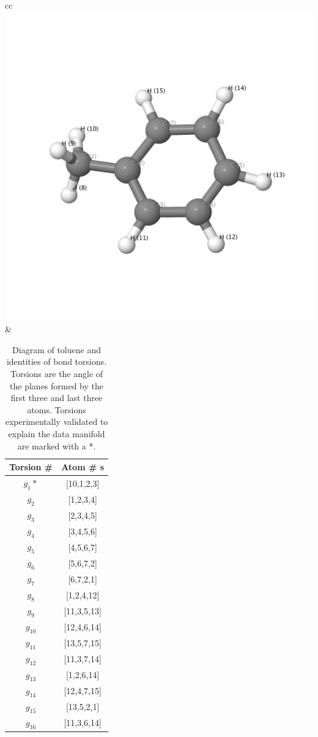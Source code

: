 \begin{table}[hbt!]
\begin{tabular}{cc}
\includegraphics[scale=0.25,valign=m]{../Figures/toluene/toluene.png}
&
\begin{tabular}{ | c | c | } 
\hline
Torsion \# & Atom \# s \\
\hline
$g_1*$ & [10,1,2,3]\\
\hline
$g_2$ & [1,2,3,4]\\
\hline
$g_3$ &[2,3,4,5]\\
\hline
$g_4$ & [3,4,5,6]\\
\hline
$g_5$ &[4,5,6,7]\\
\hline
$g_6$ &[5,6,7,2]\\
\hline
$g_7$ &[6,7,2,1]\\
\hline
$g_8$ & [1,2,4,12] \\
\hline
$g_9$  & [11,3,5,13]  \\
\hline 
$g_{10}$ & [12,4,6,14] \\
\hline 
$g_{11}$ & [13,5,7,15] \\
\hline 
$g_{12}$ & [11,3,7,14] \\
\hline 
$g_{13}$ & [1,2,6,14] \\
\hline 
$g_{14}$ & [12,4,7,15] \\
\hline 
$g_{15}$ & [13,5,2,1] \\
\hline 
$g_{16}$ & [11,3,6,14] \\
\hline
\end{tabular}
\end{tabular}
\caption{Diagram of toluene and identities of bond torsions.  Torsions are the angle of the planes formed by the first three and last three atoms. Torsions experimentally validated to explain the data manifold are marked with a *.}
\label{figtab:tol}
\end{table}

